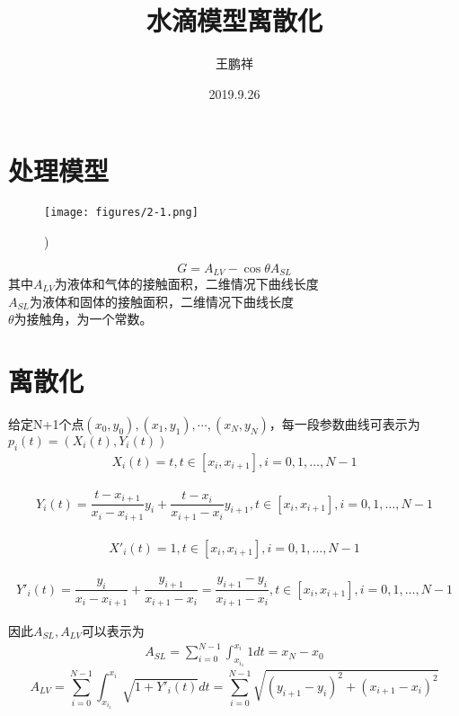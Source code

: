 \documentclass{article}
\begin{document}
\title{水滴模型离散化}
\author{王鹏祥}
\date{2019.9.26}
\maketitle

		\section{处理模型}
\begin{figure}[H]
	\centering
	\texttt{[image: figures/2-1.png]}
	\caption{}\right) 
	\label{fig:1}
\end{figure}
		\begin{equation}
			G=A_{LV}-\cos\theta A_{SL}
		\end{equation}
		其中$A_{LV}$为液体和气体的接触面积，二维情况下曲线长度\\
		$A_{SL}$为液体和固体的接触面积，二维情况下曲线长度\\
		$\theta$为接触角，为一个常数。
\section{离散化}\setlength{\parindent}{2em}
	给定N+1个点$(x_{0},y_{0}),(x_{1},y_{1}),\cdots,(x_{N},y_{N})$，每一段参数曲线可表示为$p_{i}(t)=(X_{i}(t),Y_{i}(t))$
	\begin{align}
	X_{i}(t)=t, t \in [x_{i},x_{i+1}], i=0,1,\dots,N-1
	\end{align}
	
    \begin{align}
    Y_{i}(t)= \dfrac{t-x_{i+1}}{x_{i}-x_{i+1}}y_{i}+\dfrac{t-x_{i}}{x_{i+1}-x_{i}}y_{i+1},t \in [x_{i},x_{i+1}], i=0,1,\dots,N-1
    \end{align}
	
	\begin{align}
	X'_{i}(t)=1, t \in [x_{i},x_{i+1}],i=0,1,\dots,N-1
	\end{align}
	
	\begin{align}
	Y'_{i}(t)=\dfrac{y_{i}}{x_{i}-x_{i+1}}+\dfrac{y_{i+1}}{x_{i+1}-x_{i}}=\dfrac{y_{i+1}-y_{i}}{x_{i+1}-x_{i}},t \in [x_{i},x_{i+1}],i=0,1,\dots,N-1
	\end{align}
	
	因此$ A_{SL},A_{LV}$可以表示为
	\begin{align}
	 A_{SL}=\sum_{i=0}^{N-1}\int_{x_{i_1}}^{x_{i}}1dt=x_{N}-x_{0}
	\end{align}	
	\begin{equation}
	A_{LV}=\sum_{i=0}^{N-1}\int_{x_{i_1}}^{x_{i}}\sqrt{1+Y'_{i}(t)}dt=\sum_{i=0}^{N-1}\sqrt{(y_{i+1}-y_{i} )^2+(x_{i+1}-x_{i})^2}
	\end{equation}
	
\end{document}
